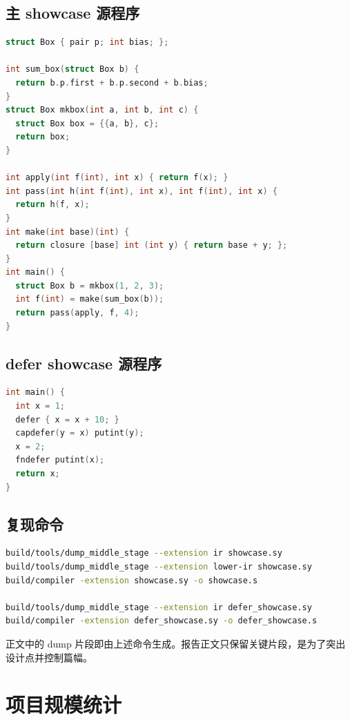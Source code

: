 \documentclass[UTF8,a4paper,11pt]{ctexart}
\begin{document}
\subsection{主 showcase 源程序}

\begin{lstlisting}[language=C]
struct Box { pair p; int bias; };

int sum_box(struct Box b) {
  return b.p.first + b.p.second + b.bias;
}
struct Box mkbox(int a, int b, int c) {
  struct Box box = {{a, b}, c};
  return box;
}

int apply(int f(int), int x) { return f(x); }
int pass(int h(int f(int), int x), int f(int), int x) {
  return h(f, x);
}
int make(int base)(int) {
  return closure [base] int (int y) { return base + y; };
}
int main() {
  struct Box b = mkbox(1, 2, 3);
  int f(int) = make(sum_box(b));
  return pass(apply, f, 4);
}
\end{lstlisting}

\subsection{defer showcase 源程序}

\begin{lstlisting}[language=C]
int main() {
  int x = 1;
  defer { x = x + 10; }
  capdefer(y = x) putint(y);
  x = 2;
  fndefer putint(x);
  return x;
}
\end{lstlisting}

\subsection{复现命令}

\begin{lstlisting}[language=bash]
build/tools/dump_middle_stage --extension ir showcase.sy
build/tools/dump_middle_stage --extension lower-ir showcase.sy
build/compiler -extension showcase.sy -o showcase.s

build/tools/dump_middle_stage --extension ir defer_showcase.sy
build/compiler -extension defer_showcase.sy -o defer_showcase.s
\end{lstlisting}

正文中的 dump 片段即由上述命令生成。报告正文只保留关键片段，是为了突出设计点并控制篇幅。

\section{项目规模统计}
\end{document}
